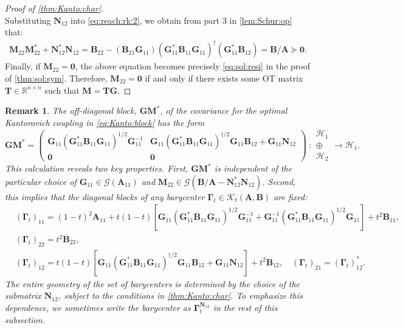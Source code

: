 \documentclass[noinfoline]{imsart}\setcounter{tocdepth}{2}
\renewcommand{\b}[1]{\mathbb{#1}} %
\newcommand{\m}[1]{\mathbf{#1}} %
\renewcommand{\c}[1]{\mathcal{#1}} %
\theoremstyle{plain}
\newtheorem{remark}{Remark}[section]
\begin{document}
\begin{proof}[Proof of \cref{thm:Kanto:char}]
\begin{equation*}
\end{equation*}
Substituting $\m{N}_{12}$ into \eqref{eq:reach:rk:2}, we obtain from part 3 in \cref{lem:Schur:op} that:
\begin{align*}
    \m{M}_{22} \m{M}_{22}^{*} + \m{N}_{12}^{*} \m{N}_{12} = \m{B}_{22} - (\m{B}_{21} \m{G}_{11}) (\m{G}_{11}^{*} \m{B}_{11} \m{G}_{11})^{\dagger} (\m{G}_{11}^{*} \m{B}_{12}) = \m{B}/\m{A} \succeq \m{0}.
\end{align*}
Finally, if $\m{M}_{22} = \m{0}$, the above equation becomes precisely \eqref{eq:sol:resi} in the proof of \cref{thm:sol:sym}. Therefore, $\m{M}_{22} = \m{0}$ if and only if there exists some OT matrix $\m{T} \in \b{R}^{n \times n}$ such that $\m{M} = \m{T} \m{G}$.
\end{proof}


\begin{remark}\label{rmk:linear:kanto}
The off-diagonal block, $\m{G} \m{M}^{*}$, of the  covariance for the optimal Kantorovich coupling in \eqref{eq:Kanto:block} has the form
\begin{equation*}
    \m{G} \m{M}^{*} = \begin{pmatrix}
    \m{G}_{11} (\m{G}_{11}^{*} \m{B}_{11} \m{G}_{11})^{1/2} \m{G}_{11}^{-1}  & \m{G}_{11} (\m{G}_{11}^{*} \m{B}_{11} \m{G}_{11})^{\dagger/2} \m{G}_{11} \m{B}_{12}  + \m{G}_{11} \m{N}_{12} \\
    \m{0} & \m{0}
    \end{pmatrix}
    \    :
    \begin{array}{c}
    \c{H}_{1} \\
    \oplus \\
    \c{H}_{2}
    \end{array}
    \rightarrow
    \c{H}_{1}.
\end{equation*}
This calculation reveals two key properties. First, $\m{G} \m{M}^{*}$ is independent of the particular choice of $\m{G}_{11} \in \c{G}(\m{A}_{11})$ and $\m{M}_{22} \in \c{G}(\m{B}/\m{A} - \m{N}_{12}^{*} \m{N}_{12})$. Second, this implies that the diagonal blocks of any barycenter $\m{\Gamma}_{t} \in \c{K}_{t}(\m{A}, \m{B})$ are fixed:
\begin{align*}
     &(\m{\Gamma}_{t})_{11} = (1-t)^{2} \m{A}_{11} + t(1-t) [\m{G}_{11} (\m{G}_{11}^{*} \m{B}_{11} \m{G}_{11})^{1/2} \m{G}_{11}^{-1} + \m{G}_{11}^{-1} (\m{G}_{11}^{*} \m{B}_{11} \m{G}_{11})^{1/2} \m{G}_{11}] + t^{2} \m{B}_{11}, \\
     &(\m{\Gamma}_{t})_{22} = t^{2} \m{B}_{22}, \\
     &(\m{\Gamma}_{t})_{12} = t(1-t) [\m{G}_{11} (\m{G}_{11}^{*} \m{B}_{11} \m{G}_{11})^{\dagger/2} \m{G}_{11} \m{B}_{12}  + \m{G}_{11} \m{N}_{12}] + t^{2} \m{B}_{12}, \quad (\m{\Gamma}_{t})_{21} = (\m{\Gamma}_{t})_{12}^{*}.
\end{align*}
The entire geometry of the set of barycenters is determined by the choice of the submatrix $\m{N}_{12}$, subject to the conditions in \cref{thm:Kanto:char}. To emphasize this dependence, we sometimes write the barycenter as $\m{\Gamma}_{t}^{\m{N}_{12}}$ in the rest of this subsection.
\end{remark}
\end{document}
